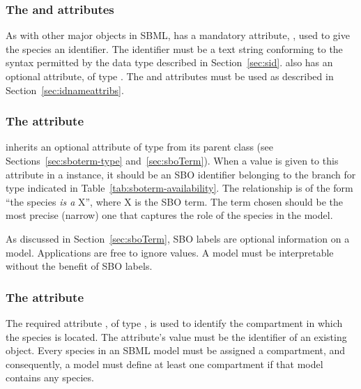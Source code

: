 \subsubsection{The  and  attributes}

As with other major objects in SBML, \Species has a mandatory
attribute, , used to give the species an identifier.  The
identifier must be a text string conforming to the syntax
permitted by the  data type described in
Section~\ref{sec:sid}.  \Species also has an optional 
attribute, of type .  The  and 
attributes must be used as described in
Section~\ref{sec:idnameattribs}.


\subsubsection{The  attribute}
\label{sec:species-sboterm}

\Species inherits an optional 
attribute of type  from its parent
class \SBase (see Sections~\ref{sec:sboterm-type}
and~\ref{sec:sboTerm}).  When a value is given to this
attribute in a \Species instance, it should be an
SBO identifier belonging to the branch for type \Species 
indicated in Table~\ref{tab:sboterm-availability}.  The relationship is
of the form ``the species \emph{is a} X'', where X is
the SBO term.  The term chosen should be the most precise (narrow)
one that captures the role of the species in the model.

As discussed in Section~\ref{sec:sboTerm}, SBO labels are optional
information on a model.  Applications are free to ignore
 values.  A model must be interpretable without the
benefit of SBO labels.


\subsubsection{The  attribute}
\label{sec:species-compartment}

The required attribute , of type
, is used to identify the compartment in which the
species is located.  The attribute's value must be the identifier of
an existing \Compartment object. Every species in an SBML model 
must be assigned a compartment, and consequently, a model must define 
at least one compartment if that model contains any species.


